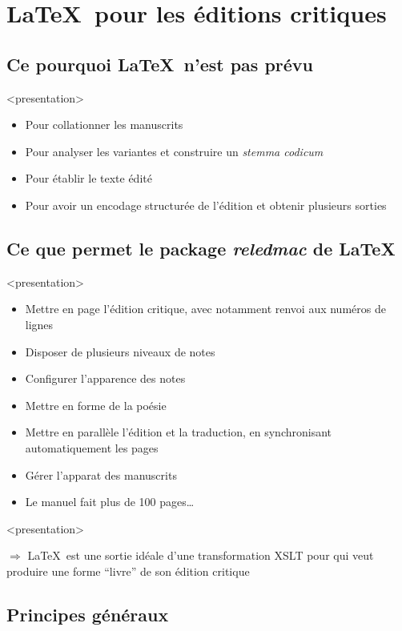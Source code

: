 \documentclass[transnotheorems,noamsthm]{beamer}
\newenvironment{slide}{%
  \begin{frame}
  <presentation>\mode<presentation>{\frametitle{\insertsubsection}}%
  }%
  {\end{frame}}
\begin{document}
\section{\LaTeX\ pour les éditions critiques}
\subsection{Ce pourquoi \LaTeX\ n'est pas prévu}

\begin{slide}
  \begin{itemize}
    \item Pour collationner les manuscrits
    \item Pour analyser les variantes et construire un \emph{stemma codicum}
    \item Pour établir le texte édité
    \item Pour avoir un encodage structurée de l'édition et obtenir plusieurs sorties
  \end{itemize}
\end{slide}
\subsection{Ce que permet le package \emph{reledmac} de \LaTeX}

\begin{slide}
  \begin{itemize}
    \item Mettre en page l'édition critique, avec notamment renvoi aux numéros de lignes
    \item Disposer de plusieurs niveaux de notes
    \item Configurer l'apparence des notes
    \item Mettre en forme de la poésie
    \item Mettre en parallèle l'édition et la traduction, en synchronisant automatiquement les pages
    \item Gérer l'apparat des manuscrits
    \item Le manuel fait plus de 100 pages\ldots
  \end{itemize}
\end{slide}

\begin{slide}
  \alert{$\Longrightarrow$}  \LaTeX\  est une sortie idéale d'une transformation XSLT pour qui veut produire une forme \enquote{livre} de son édition critique
\end{slide}
\subsection{Principes généraux}
\end{document}
